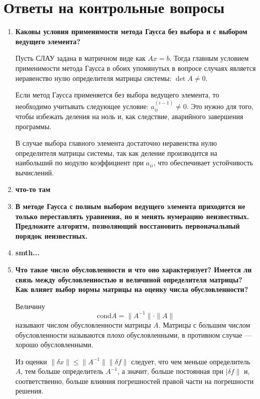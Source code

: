 \documentclass[12pt, a4paper]{article}
\begin{document}
	\section*{Ответы на контрольные вопросы}
	\begin{enumerate}
		\item \textbf{Каковы условия применимости метода Гаусса без выбора и с выбором ведущего элемента?}
		
		Пусть СЛАУ задана в матричном виде как $Ax=b$. Тогда главным условием применимости метода Гаусса в обоих упомянутых в вопросе случаях является неравенство нулю определителя матрицы системы: $\det A\neq0$.
		
		Если метод Гаусса применяется без выбора ведущего элемента, то необходимо учитывать следующее условие: $a_{ii}^{(i-1)}\neq0$. Это нужно для того, чтобы избежать деления на ноль и, как следствие, аварийного завершения программы.
		
		В случае выбора главного элемента достаточно неравенства нулю определителя матрицы системы, так как деление производится на наибольший по модулю коэффициент при $a_{ii}$, что обеспечивает устойчивость вычислений.
		
		\item \textbf{что-то там}
		
		\item\textbf{В методе Гаусса с полным выбором ведущего элемента
		приходится не только переставлять уравнения, но и менять нумерацию неизвестных. Предложите алгоритм, позволяющий восстановить первоначальный порядок неизвестных.}
		
		\item \textbf{smth...}
		
		\item \textbf{Что такое число обусловленности и что оно характеризует? Имеется ли связь между обусловленностью и величиной определителя матрицы? Как влияет выбор нормы матрицы на оценку числа обусловленности?}
		
		Величину
		$$
		\text{cond} A = \|A^{-1}\|\cdot\|A\|
		$$
		называют числом обусловленности матрицы $A$. Матрицы с большим числом обусловленности называются плохо обусловленными, в противном случае --- хорошо обусловленными.
		
		Из оценки $\|\delta x\|\leqslant\|A^{-1}\|\|\delta f\|$ следует, что чем меньше определитель $A$, тем больше определитель $A^{-1}$, а значит, больше постоянная при $|\delta f\|$ и, соответственно, больше влияния погрешностей правой части на погрешности решения.
		

\end{enumerate}
\end{document}
